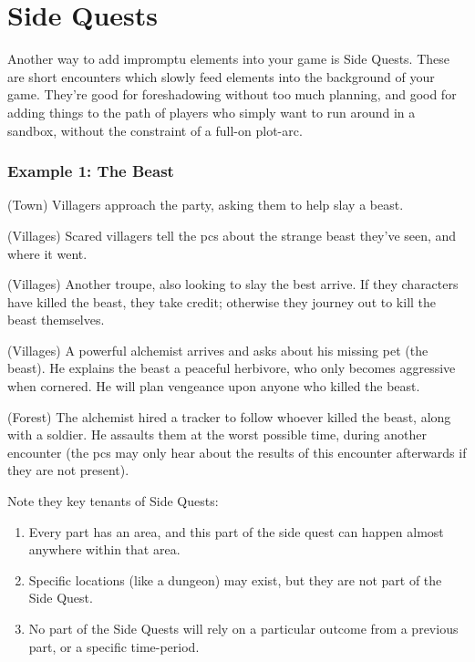 \section{Side Quests}\label{sidequests}

\begin{multicols}{2}

\noindent
Another way to add impromptu elements into your game is Side Quests.
These are short encounters which slowly feed elements into the background of your game.
They're good for foreshadowing without too much planning, and good for adding things to the path of players who simply want to run around in a sandbox, without the constraint of a full-on plot-arc.

\subsubsection{Example 1: The Beast}

\begin{list}{\sqn}{}

  \item[\sqr]
  (Town) Villagers approach the party, asking them to help slay a beast.
  \item
  (Villages)
  Scared villagers tell the \glspl{pc} about the strange beast they've seen, and where it went.
  \item
  (Villages) Another troupe, also looking to slay the best arrive. If they characters have killed the beast, they take credit; otherwise they journey out to kill the beast themselves.
  \item
  (Villages)
  A powerful alchemist arrives and asks about his missing pet (the beast).
  He explains the beast a peaceful herbivore, who only becomes aggressive when cornered.
  He will plan vengeance upon anyone who killed the beast.
  \item
  (Forest) \squash
  The alchemist hired a tracker to follow whoever killed the beast, along with a soldier.
  He assaults them at the worst possible time, during another encounter (the \glspl{pc} may only hear about the results of this encounter afterwards if they are not present).

\end{list}

Note they key tenants of Side Quests:

\begin{enumerate}

  \item
  Every part has an area, and this part of the side quest can happen almost anywhere within that area.
  \item
  Specific locations (like a dungeon) may exist, but they are not part of the Side Quest.
  \item
  No part of the Side Quests will rely on a particular outcome from a previous part, or a specific time-period.


\end{enumerate}
\end{multicols}
